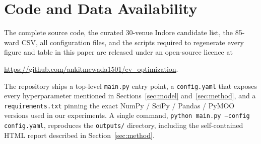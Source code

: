 \documentclass[conference]{IEEEtran}
\begin{document}
\section*{Code and Data Availability}
\label{sec:repro}
The complete source code, the curated 30-venue Indore candidate
list, the 85-ward CSV, all configuration files, and the scripts
required to regenerate every figure and table in this paper are
released under an open-source licence at
\begin{center}
\url{https://github.com/ankitmewada1501/ev_optimization}.
\end{center}
The repository ships a top-level \texttt{main.py} entry point, a
\texttt{config.yaml} that exposes every hyperparameter mentioned in
Sections~\ref{sec:model} and~\ref{sec:method}, and a
\texttt{requirements.txt} pinning the exact NumPy / SciPy / Pandas /
PyMOO versions used in our experiments. A single command,
\texttt{python main.py --config config.yaml}, reproduces the
\texttt{outputs/} directory, including the self-contained HTML
report described in Section~\ref{sec:method}.
\end{document}

